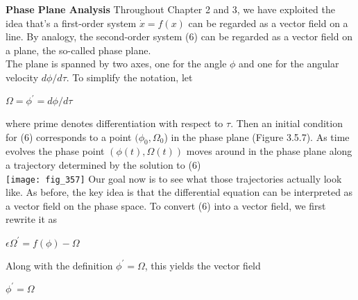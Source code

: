 \documentclass{article}
\newcommand\tab[1][1cm]{\hspace*{#1}}
\begin{document}
\textbf {Phase Plane Analysis}
\tab Throughout Chapter 2 and 3, we have exploited the idea that's a first-order system $\dot{x}=f(x)$ can be regarded as a vector field on a line. By analogy, the second-order system (6) can be regarded as a vector field on a plane, the so-called phase plane. \\
\tab The plane is spanned by two axes, one for the angle $\phi$ and one for the angular velocity $d \phi/ d \tau$. To simplify the notation, let
\begin{center}
$\Omega = \phi^{'} = d \phi / d \tau$
\end{center}
where prime denotes differentiation with respect to $\tau$. Then an initial condition for (6) corresponds to a point $(\phi_{0}, \Omega_{0}$) in the phase plane (Figure 3.5.7). As time evolves the phase point $(\phi(t), \Omega(t))$ moves around in the phase plane along a trajectory determined by the solution to (6) \\
\texttt{[image: fig\_357]}
\tab Our goal now is to see what those trajectories actually look like. As before, the key idea is that the differential equation can be interpreted as a vector field on the phase space. To convert (6) into a vector field, we first rewrite it as
\begin{center}
$\epsilon \Omega^{'} = f(\phi)-\Omega$
\end{center}
Along with the definition $\phi^{'}=\Omega$, this yields the vector field
\begin{center}
$\phi^{'}=\Omega$
\end{center}
\end{document}

